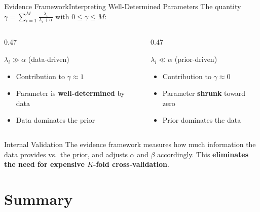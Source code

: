 \begin{frame}{Evidence Framework}{Interpreting Well-Determined Parameters}
  The quantity $\gamma = \sum_{i=1}^M \frac{\lambda_i}{\lambda_i + \alpha}$ with $0 \le \gamma \le M$:

  \begin{columns}
    \begin{column}{0.47\textwidth}
      \begin{block}{$\lambda_i \gg \alpha$ (data-driven)}
        \begin{itemize}
          \item Contribution to $\gamma \approx 1$
          \item Parameter is \textbf{well-determined} by data
          \item Data dominates the prior
        \end{itemize}
      \end{block}
    \end{column}
    \begin{column}{0.47\textwidth}
      \begin{block}{$\lambda_i \ll \alpha$ (prior-driven)}
        \begin{itemize}
          \item Contribution to $\gamma \approx 0$
          \item Parameter \textbf{shrunk} toward zero
          \item Prior dominates the data
        \end{itemize}
      \end{block}
    \end{column}
  \end{columns}

  \bigskip
  \begin{exampleblock}{Internal Validation}
    The evidence framework measures how much information the data provides vs.\ the prior, and adjusts $\alpha$ and $\beta$ accordingly. This \textbf{eliminates the need for expensive $K$-fold cross-validation}.
  \end{exampleblock}
\end{frame}

\section{Summary}

